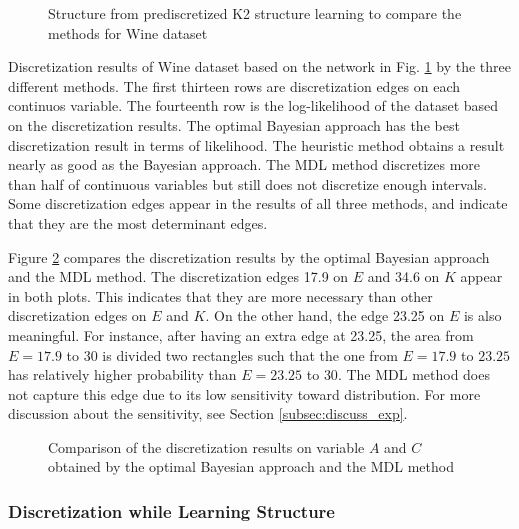 \begin{figure}[ht]
  \centering
  \scalebox{0.8}{
      }
  \caption{Structure from prediscretized K2 structure learning to compare the methods for Wine dataset}
  \label{fig:wine_graph_1}
\end{figure}

\begin{table}
  \centering
  \caption{Discretization results of Wine dataset based on the network in Fig. \ref{fig:wine_graph_1} by the three different methods. The first thirteen rows are discretization edges on each continuos variable. The fourteenth row is the log-likelihood of the dataset based on the discretization results. The optimal Bayesian approach has the best discretization result in terms of likelihood. The heuristic method obtains a result nearly as good as the Bayesian approach. The MDL method discretizes more than half of continuous variables but still does not discretize enough intervals. Some discretization edges appear in the results of all three methods, and indicate that they are the most determinant edges.}
  \scalebox{1.0}{
  
  }
  \label{table:wine_disc_table_1}
\end{table}

Figure \ref{fig:wine_exp1_distr} compares the discretization results by the optimal Bayesian approach and the MDL method. The discretization edges \num{17.9} on $E$ and \num{34.6} on $K$ appear in both plots. This indicates that they are more necessary than other discretization edges on $E$ and $K$. On the other hand, the edge \num{23.25} on $E$ is also meaningful. For instance, after having an extra edge at \num{23.25}, the area from $E = 17.9$ to $30$ is divided two rectangles such that the one from $E=17.9$ to $23.25$ has relatively higher probability than $E=23.25$ to $30$. The MDL method does not capture this edge due to its low sensitivity toward distribution. For more discussion about the sensitivity, see Section \ref{subsec:discuss_exp}.

\begin{figure}[ht]
  \centering
    
  \caption{Comparison of the discretization results on variable $A$ and $C$ obtained by the optimal Bayesian approach and the MDL method}
  \label{fig:wine_exp1_distr}
\end{figure}

\subsubsection{Discretization while Learning Structure}
\label{subsubsec:wine_exp2}

